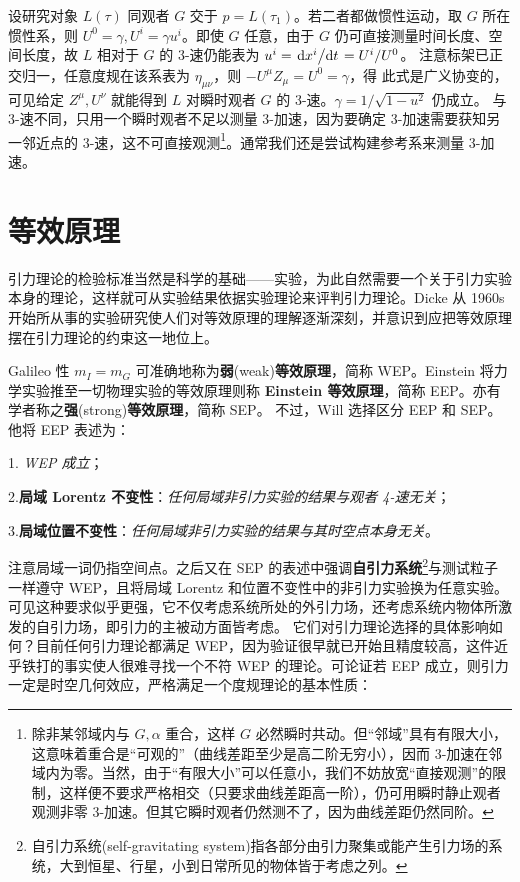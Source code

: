 设研究对象 $L(\tau)$ 同观者 $G$ 交于 $p=L(\tau_1)$。若二者都做惯性运动，取 $G$ 所在惯性系，则 $U^0=\gamma,U^i=\gamma u^i$。即使 $G$ 任意，由于 $G$ 仍可直接测量时间长度、空间长度，故 $L$ 相对于 $G$ 的 3-速仍能表为 $u^i=\dv*{x^i}{t}={U^i}/{U^0}$。
注意标架已正交归一，任意度规在该系表为 $\eta_{\mu\nu}$，则 $-U^\mu Z_\mu=U^0=\gamma$，得
此式是广义协变的，可见给定 $Z^\mu,U^\nu$ 就能得到 $L$ 对瞬时观者 $G$ 的 3-速。$\gamma=1/{\sqrt{1-u^2}}$ 仍成立。
与 3-速不同，只用一个瞬时观者不足以测量 3-加速，因为要确定 3-加速需要获知另一邻近点的 3-速，这不可直接观测\footnote{除非某邻域内与 $G,\alpha$ 重合，这样 $G$ 必然瞬时共动。但“邻域”具有有限大小，这意味着重合是“可观的”（曲线差距至少是高二阶无穷小），因而 3-加速在邻域内为零。当然，由于“有限大小”可以任意小，我们不妨放宽“直接观测”的限制，这样便不要求严格相交（只要求曲线差距高一阶），仍可用瞬时静止观者观测非零 3-加速。但其它瞬时观者仍然测不了，因为曲线差距仍然同阶。}。通常我们还是尝试构建参考系来测量 3-加速。

\section{等效原理}\label{sec:eq-prin}



引力理论的检验标准当然是科学的基础——实验，为此自然需要一个关于引力实验本身的理论，这样就可从实验结果依据实验理论来评判引力理论。Dicke 从 1960s 开始所从事的实验研究使人们对等效原理的理解逐渐深刻，并意识到应把等效原理摆在引力理论的约束这一地位上。

Galileo 性 $m_I=m_G$ 可准确地称为\textbf{弱}(weak)\textbf{等效原理}，简称 WEP。Einstein 将力学实验推至一切物理实验的等效原理则称 \textbf{Einstein 等效原理}，简称 EEP。亦有学者称之\textbf{强}(strong)\textbf{等效原理}，简称 SEP。
不过，Will\cite{Will18} 选择区分 EEP 和 SEP。他将 EEP 表述为：

    1. \textit{WEP 成立}；

    2.\textbf{局域 Lorentz 不变性}：\textit{任何局域非引力实验的结果与观者 4-速无关}；
    
    3.\textbf{局域位置不变性}：\textit{任何局域非引力实验的结果与其时空点本身无关}。

\noindent 注意局域一词仍指空间点。之后又在 SEP 的表述中强调\textbf{自引力系统}\footnote{自引力系统(self-gravitating system)指各部分由引力聚集或能产生引力场的系统，大到恒星、行星，小到日常所见的物体皆于考虑之列。}与测试粒子一样遵守 WEP，且将局域 Lorentz 和位置不变性中的非引力实验换为任意实验。可见这种要求似乎更强，它不仅考虑系统所处的外引力场，还考虑系统内物体所激发的自引力场，即引力的主被动方面皆考虑。
它们对引力理论选择的具体影响如何？目前任何引力理论都满足 WEP，因为验证很早就已开始且精度较高，这件近乎铁打的事实使人很难寻找一个不符 WEP 的理论。可论证若 EEP 成立，则引力一定是时空几何效应，严格满足一个度规理论的基本性质：

